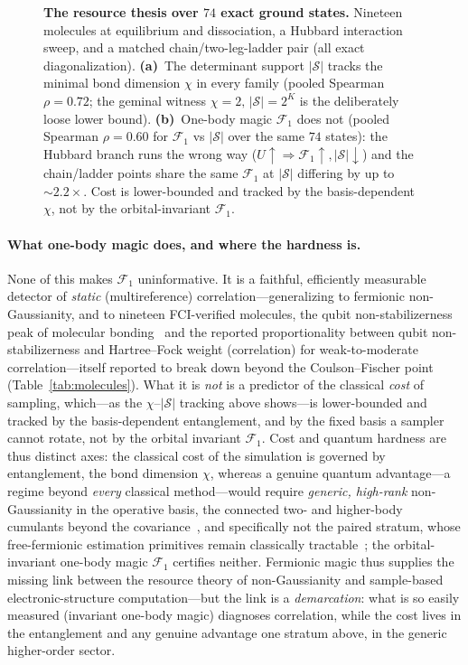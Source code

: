 \begin{figure}[htbp]\centering
\caption{\textbf{The resource thesis over $74$ exact ground states.} Nineteen molecules at equilibrium and
dissociation, a Hubbard interaction sweep, and a matched chain/two-leg-ladder pair (all exact
diagonalization). \textbf{(a)}~The determinant support $|\mathcal S|$ tracks the minimal bond dimension
$\chi$ in every family (pooled Spearman $\rho=0.72$; the geminal witness $\chi{=}2,\,|\mathcal S|{=}2^{K}$
is the deliberately loose lower bound). \textbf{(b)}~One-body magic $\mathcal F_1$ does not (pooled
Spearman $\rho=0.60$ for $\mathcal F_1$ vs $|\mathcal S|$ over the same $74$ states): the Hubbard
branch runs the wrong way ($U\!\uparrow\Rightarrow\mathcal F_1\!\uparrow,|\mathcal S|\!\downarrow$) and the
chain/ladder points share the same $\mathcal F_1$ at $|\mathcal S|$ differing by up to $\sim\!2.2\times$. Cost is lower-bounded and tracked by
the basis-dependent $\chi$, not by the orbital-invariant $\mathcal F_1$.}\label{fig:master}\end{figure}

\paragraph{What one-body magic does, and where the hardness is.} None of this makes $\mathcal F_1$
uninformative. It is a faithful, efficiently measurable detector of \emph{static} (multireference)
correlation---generalizing to fermionic non-Gaussianity, and to nineteen FCI-verified molecules, the
qubit non-stabilizerness peak of molecular bonding~\cite{sarkis2025} and the reported proportionality
between qubit non-stabilizerness and Hartree--Fock weight (correlation) for weak-to-moderate
correlation---itself reported to break down beyond the Coulson--Fischer point~\cite{seibert2026}
(Table~\ref{tab:molecules}). What it is
\emph{not} is a predictor of the classical \emph{cost} of sampling, which---as the $\chi$--$|\mathcal S|$
tracking above shows---is lower-bounded and tracked by the basis-dependent entanglement, and by the fixed basis a sampler
cannot rotate, not by the orbital invariant $\mathcal F_1$. Cost and quantum hardness are thus distinct
axes: the classical cost of the simulation is governed by entanglement, the bond dimension $\chi$,
whereas a genuine quantum advantage---a regime beyond \emph{every} classical method---would require
\emph{generic, high-rank} non-Gaussianity in the operative basis, the connected two- and higher-body
cumulants beyond the covariance~\cite{coffman2025}, and specifically not the paired stratum, whose
free-fermionic estimation primitives remain classically tractable~\cite{oh2026}; the orbital-invariant
one-body magic $\mathcal F_1$ certifies neither. Fermionic magic thus supplies the missing link between the resource theory of non-Gaussianity
and sample-based electronic-structure computation---but the link is a \emph{demarcation}: what is so
easily measured (invariant one-body magic) diagnoses correlation, while the cost lives in the
entanglement and any genuine advantage one stratum above, in the generic higher-order sector.
